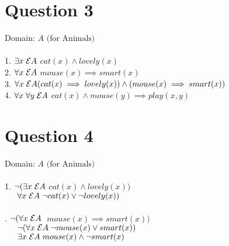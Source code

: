 \documentclass{article}
\begin{document}
    \section*{Question 3}
    Domain: $A \text{ (for Animals)}$ \\ \\
    1. $\exists x \hspace{0.1cm} \mathcal{E} A$ 
    $cat(x) \land lovely(x)$ \\
    2. $\forall x \hspace{0.1cm} \mathcal{E} A$ 
    $mouse(x) \implies smart(x)$ \\
    3. $\forall x \hspace{0.1cm} \mathcal{E} A (cat(x) \implies lovely(x)) \land (mouse(x) \implies smart(x))$ \\
    4. $\forall x \hspace{0.1cm} \forall y \hspace{0.1cm} \mathcal{E} A$
    $cat(x) \land mouse(y) \implies play(x,y)$ \\
    
    \newpage
    \section*{Question 4}
    Domain: $A \text{ (for Animals)}$ \\ \\
    1. $\neg (\exists x \hspace{0.1cm} \mathcal{E} A$ 
    $cat(x) \land lovely(x))$ \\
    $\indent \forall x  \hspace{0.1cm} \mathcal{E} A  \hspace{0.1cm} \neg cat(x) \lor \neg lovely(x))$\\ \\
    
    . $\neg(\forall x \hspace{0.1cm} \mathcal{E} A  \hspace{0.1cm}$ 
    $mouse(x) \implies smart(x))$ \\
    $\indent \neg(\forall x  \hspace{0.1cm} \mathcal{E} A  \hspace{0.1cm} \neg mouse(x) \lor smart(x))$\\
    $\indent \exists x  \hspace{0.1cm} \mathcal{E} A \hspace{0.1cm} mouse(x) \land \neg smart(x)$ \\ \\
    
\end{document}
